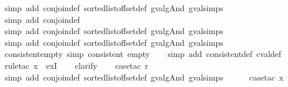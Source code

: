 \begin{isabellebody}
\ {\isacharparenleft}simp\ add{\isacharcolon}\ conjoin{\isacharunderscore}def\ sorted{\isacharunderscore}list{\isacharunderscore}of{\isacharunderscore}fset{\isacharunderscore}def\ gval{\isacharunderscore}gAnd\ gval{\isachardot}simps{\isacharparenleft}{}{\isacharparenright}{\isacharparenright}\isanewline
\ \ \ \ \isamarkupfalse%
\ {\isacharparenleft}simp\ add{\isacharcolon}\ conjoin{\isacharunderscore}def{\isacharparenright}\isanewline
\ \ \ \isamarkupfalse%
\ {\isacharparenleft}simp\ add{\isacharcolon}\ conjoin{\isacharunderscore}def\ sorted{\isacharunderscore}list{\isacharunderscore}of{\isacharunderscore}fset{\isacharunderscore}def\ gval{\isacharunderscore}gAnd\ gval{\isachardot}simps{\isacharparenleft}{}{\isacharparenright}{\isacharparenright}\isanewline
\ \ \isamarkupfalse%
\ {\isacharparenleft}simp\ add{\isacharcolon}\ conjoin{\isacharunderscore}def\ sorted{\isacharunderscore}list{\isacharunderscore}of{\isacharunderscore}fset{\isacharunderscore}def\ gval{\isacharunderscore}gAnd\ gval{\isachardot}simps{\isacharparenleft}{}{\isacharparenright}{\isacharparenright}%
\endisatagproof
{\isafoldproof}%
%
\isadelimproof
\isanewline
%
\endisadelimproof
\isanewline
{}\isamarkupfalse%
\ consistent{\isacharunderscore}empty\ {\isacharbrackleft}simp{\isacharbrackright}{\isacharcolon}\ {\isachardoublequoteopen}consistent\ empty{\isachardoublequoteclose}\isanewline
%
\isadelimproof
\ \ %
\endisadelimproof
%
\isatagproof
{}\isamarkupfalse%
\ {\isacharparenleft}simp\ add{\isacharcolon}\ consistent{\isacharunderscore}def\ cval{\isacharunderscore}def{\isacharparenright}\isanewline
\ \ \isamarkupfalse%
\ {\isacharparenleft}rule{\isacharunderscore}tac\ x{\isacharequal}{\isachardoublequoteopen}{\isacharless}{\isachargreater}{\isachardoublequoteclose}\ \ exI{\isacharparenright}\isanewline
\ \ \isamarkupfalse%
\ clarify\isanewline
\ \ \isamarkupfalse%
\ {\isacharparenleft}case{\isacharunderscore}tac\ r{\isacharparenright}\isanewline
\ \ \ \ \ \isamarkupfalse%
\ {\isacharparenleft}simp\ add{\isacharcolon}\ conjoin{\isacharunderscore}def\ sorted{\isacharunderscore}list{\isacharunderscore}of{\isacharunderscore}fset{\isacharunderscore}def\ gval{\isacharunderscore}gAnd\ gval{\isachardot}simps{\isacharparenleft}{}{\isacharparenright}{\isacharparenright}\isanewline
\ \ \ \ \isamarkupfalse%
\ {\isacharparenleft}case{\isacharunderscore}tac\ x{}{\isacharparenright}\isanewline

\end{isabellebody}
